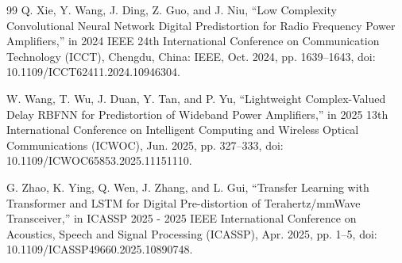 \documentclass[20pt, cjk, slidetop, table]{beamer}
\begin{document}
\begin{frame}[allowframebreaks]
\begin{thebibliography}{99}
 Q. Xie, Y. Wang, J. Ding, Z. Guo, and J. Niu, ``Low Complexity Convolutional Neural Network Digital Predistortion for Radio Frequency Power Amplifiers,'' in 2024 IEEE 24th International Conference on Communication Technology (ICCT), Chengdu, China: IEEE, Oct. 2024, pp. 1639--1643, doi: 10.1109/ICCT62411.2024.10946304.

 W. Wang, T. Wu, J. Duan, Y. Tan, and P. Yu, ``Lightweight Complex-Valued Delay RBFNN for Predistortion of Wideband Power Amplifiers,'' in 2025 13th International Conference on Intelligent Computing and Wireless Optical Communications (ICWOC), Jun. 2025, pp. 327--333, doi: 10.1109/ICWOC65853.2025.11151110.

 G. Zhao, K. Ying, Q. Wen, J. Zhang, and L. Gui, ``Transfer Learning with Transformer and LSTM for Digital Pre-distortion of Terahertz/mmWave Transceiver,'' in ICASSP 2025 - 2025 IEEE International Conference on Acoustics, Speech and Signal Processing (ICASSP), Apr. 2025, pp. 1--5, doi: 10.1109/ICASSP49660.2025.10890748.
\end{thebibliography}
\end{frame}
\end{document}
